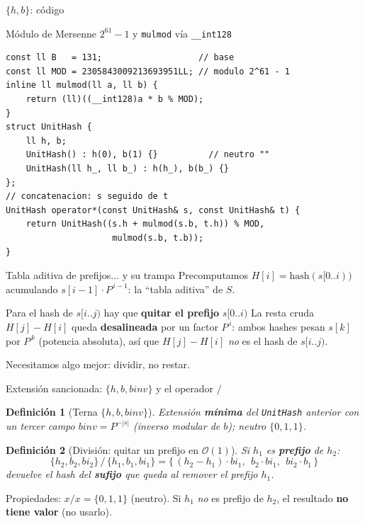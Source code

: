 \documentclass{beamer}
\newtheorem{definicion}{Definición}
\begin{document}
\begin{frame}[fragile]{$\{h,b\}$: código}
\begin{exampleblock}{Módulo de Mersenne $2^{61}-1$ y \texttt{mulmod} vía \texttt{\_\_int128}}
{\small
\begin{verbatim}
const ll B   = 131;                   // base
const ll MOD = 2305843009213693951LL; // modulo 2^61 - 1
inline ll mulmod(ll a, ll b) {
    return (ll)((__int128)a * b % MOD);
}
struct UnitHash {
    ll h, b;
    UnitHash() : h(0), b(1) {}          // neutro ""
    UnitHash(ll h_, ll b_) : h(h_), b(b_) {}
};
// concatenacion: s seguido de t
UnitHash operator*(const UnitHash& s, const UnitHash& t) {
    return UnitHash((s.h + mulmod(s.b, t.h)) % MOD,
                     mulmod(s.b, t.b));
}
\end{verbatim}
}
\end{exampleblock}
\end{frame}

\begin{frame}{Tabla aditiva de prefijos... y su trampa}
Precomputamos $H[i] = \text{hash}(s[0..i))$ acumulando $s[i{-}1]\cdot P^{\,i-1}$: la ``tabla aditiva'' de $S$.
\begin{block}{Para el hash de $s[i..j)$ hay que \textbf{quitar el prefijo} $s[0..i)$}
La resta cruda $H[j] - H[i]$ queda \textbf{desalineada} por un factor $P^{\,i}$: ambos hashes pesan $s[k]$ por $P^{\,k}$ (potencia absoluta), así que $H[j]-H[i]$ \emph{no} es el hash de $s[i..j)$.
\end{block}
Necesitamos algo mejor: dividir, no restar.
\end{frame}

\begin{frame}{Extensión sancionada: $\{h,b,binv\}$ y el operador $/$}
\begin{definicion}[Terna $\{h,b,binv\}$]
Extensión \textbf{mínima} del \texttt{UnitHash} anterior con un tercer campo $binv = P^{-|s|}$ (inverso modular de $b$); neutro $\{0,1,1\}$.
\end{definicion}
\begin{definicion}[División: quitar un prefijo en $\mathcal{O}(1)$]
Si $h_1$ es \textbf{prefijo} de $h_2$:
\[
\{h_2,b_2,bi_2\} \,/\, \{h_1,b_1,bi_1\}
= \{\,(h_2 - h_1)\cdot bi_1,\ \ b_2\cdot bi_1,\ \ bi_2\cdot b_1\,\}
\]
devuelve el hash del \textbf{sufijo} que queda al remover el prefijo $h_1$.
\end{definicion}
Propiedades: $x / x = \{0,1,1\}$ (neutro). Si $h_1$ \emph{no} es prefijo de $h_2$, el resultado \textbf{no tiene valor} (no usarlo).
\end{frame}
\end{document}

